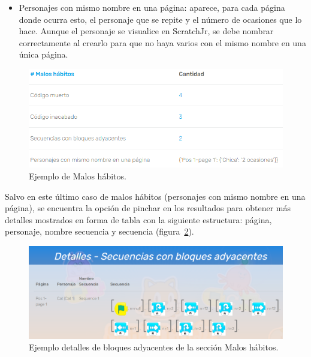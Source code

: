\documentclass[a4paper, 12pt]{book}
\begin{document}
\begin{itemize}
\begin{itemize}
        \item Personajes con mismo nombre en una página: aparece, para cada página donde ocurra esto, el personaje que se repite y el número de ocasiones que lo hace.
        Aunque el personaje se visualice en ScratchJr, se debe nombrar correctamente al crearlo para que no haya varios con el mismo nombre en una única página.
     \end{itemize}    
    \begin{figure}[H]
       \centering
       \includegraphics[width=16cm, keepaspectratio]{img/maloshabitos.PNG}
       \caption{Ejemplo de Malos hábitos.}
       \label{fig:malos-habitos}
    \end{figure}
        
    Salvo en este último caso de malos hábitos (personajes con mismo nombre en una página), se encuentra la opción de pinchar en los resultados para obtener más detalles mostrados en forma de tabla con la siguiente estructura: página, personaje, nombre secuencia y secuencia (figura~\ref{fig:bloques-adyac-detalles}). 
    \begin{figure}[H]
        \centering
        \includegraphics[width=16cm, keepaspectratio]{img/maloshabitos-ady-detalles.PNG}
        \caption{Ejemplo detalles de bloques adyacentes de la sección Malos hábitos.}
        \label{fig:bloques-adyac-detalles}
    \end{figure}


\end{itemize}
\end{document}

